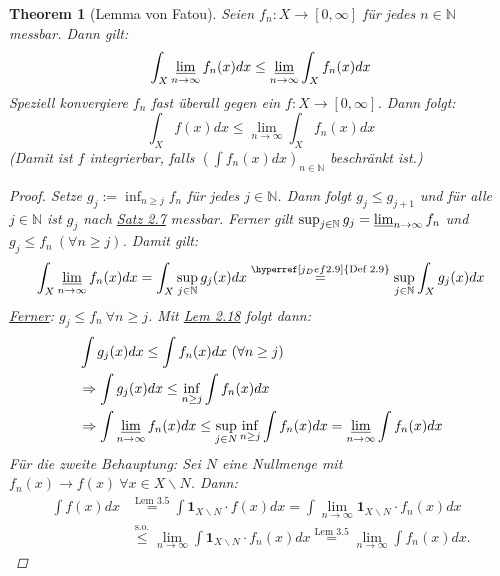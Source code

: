 \documentclass[a4paper]{scrreprt}
\newcommand{\doubleOne}{\textbf{1}}
\newcommand{\N}{\mathbb{N}}
\newcommand{\toInf}{\rightarrow \infty}
\newcommand{\limToInf}[1]{\lim_{#1 \toInf}}
\newcommand{\jlabel}[1]{\label{j_#1}}
\newcommand{\jshortlink}[1]{\jhyperref{#1}{\text{#1}}}
\newcommand{\jhyperref}[2]{\hyperref[j_#1]{#2}}
\newcommand{\jlink}[1]{\jhyperref{#1}{#1}}
\newcommand{\jabb}[3]{ #1: #2 \rightarrow #3 }
\theoremstyle{plain}
\newtheorem{thm}{Theorem}[chapter]
\theoremstyle{definition}
\begin{document}
{{{{\begin{thm}[Lemma von Fatou]
\jlabel{Thm 3.9}
\jlabel{Fatou}
    Seien $\jabb{f_n}{X}{[0,\infty]}$ für jedes $n\in\N$ messbar. Dann gilt:
    \begin{displaymath}
        \int_X \varliminf_{n\rightarrow \infty} f_n(x) dx \le \varliminf_{n\rightarrow\infty} \int_X f_n(x) dx
    \end{displaymath}
    Speziell konvergiere $f_n$ fast überall gegen ein $\jabb{f}{X}{[0,\infty]}$. Dann folgt:
    \begin{displaymath}
        \int_X f(x) dx \le \lim_{n\rightarrow \infty} \int_X f_n(x) dx
    \end{displaymath}
    (Damit ist $f$ integrierbar, falls $\left (\int f_n(x) dx \right)_{n\in\N}$ beschränkt ist.)
    \begin{proof}
        Setze $g_j := \inf_{n\ge j} f_n$ für jedes $j\in\N$. Dann folgt $g_j \le g_{j+1}$ und für alle $j\in\N$ ist $g_j$ nach \jlink{Satz 2.7} messbar. Ferner gilt $\sup_{j\in\N} g_j = \varliminf_{n\rightarrow \infty} f_n$ und $g_j \le f_n \ (\forall n \ge j)$. Damit gilt:
        \begin{displaymath}
            \int_X \varliminf_{n\rightarrow \infty} f_n(x)dx = \int_X \sup_{j\in\N} g_j(x)dx \overset{\jshortlink{Def 2.9}}{=} \sup_{j\in \N} \int_X g_j(x)dx
        \end{displaymath}
        \uline{Ferner}: $g_j \le f_n \ \forall n\ge j$. Mit \jlink{Lem 2.18} folgt dann:
        \begin{displaymath}
            \begin{split}
                &\int g_j(x) dx \le \int f_n(x) dx \ (\forall n\ge j) \\
                &\Rightarrow \int g_j(x) dx \le \inf_{n\ge j} \int f_n(x) dx \\
                &\Rightarrow \int \varliminf_{n\rightarrow \infty} f_n(x) dx \le \sup_{j\in N} \inf_{n\ge j} \int f_n(x) dx = \varliminf_{n\rightarrow \infty} \int f_n(x) dx
            \end{split}
        \end{displaymath}
        Für die zweite Behauptung: Sei $N$ eine Nullmenge mit $f_n(x) \rightarrow f(x) \ \forall x\in X\backslash N$. Dann:
        \begin{displaymath}
            \begin{split}
                \int f(x) dx &\overset{\jshortlink{Lem 3.5}}{=} \int \doubleOne_{X\backslash N} \cdot f(x) dx = \int \lim_{n\rightarrow \infty} \doubleOne_{X\backslash N} \cdot f_n(x) dx \\
                &\overset{\text{s.o.}}{\le} \limToInf{n} \int \doubleOne_{X\backslash N} \cdot f_n(x) dx \overset{\jshortlink{Lem 3.5}}{=} \limToInf{n} \int f_n(x) dx.
            \end{split}
        \end{displaymath}
    \end{proof}
\end{thm}

}}}}
\end{document}
